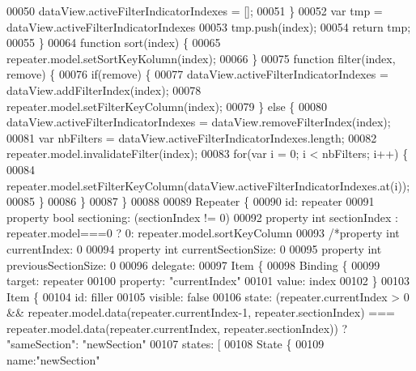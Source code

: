 \begin{DoxyCode}
00050             dataView.activeFilterIndicatorIndexes = [];
00051         \}
00052         var tmp = dataView.activeFilterIndicatorIndexes
00053         tmp.push(index);
00054         \textcolor{keywordflow}{return} tmp;
00055     \}
00064     \textcolor{keyword}{function} sort(index) \{
00065         repeater.model.setSortKeyKolumn(index);
00066     \}
00075     \textcolor{keyword}{function} filter(index, \textcolor{keyword}{remove}) \{
00076         \textcolor{keywordflow}{if}(\textcolor{keyword}{remove}) \{
00077             dataView.activeFilterIndicatorIndexes = dataView.addFilterIndex(index);
00078             repeater.model.setFilterKeyColumn(index);
00079         \} \textcolor{keywordflow}{else} \{
00080             dataView.activeFilterIndicatorIndexes = dataView.removeFilterIndex(index);
00081             var nbFilters = dataView.activeFilterIndicatorIndexes.length;
00082             repeater.model.invalidateFilter(index);
00083             \textcolor{keywordflow}{for}(var i = 0; i < nbFilters; i++) \{
00084                 repeater.model.setFilterKeyColumn(dataView.activeFilterIndicatorIndexes.at(i));
00085             \}
00086         \}
00087     \}
00088 
00089     Repeater \{
00090         \textcolor{keywordtype}{id}: repeater
00091         \textcolor{keyword}{property} \textcolor{keywordtype}{bool} sectioning: (sectionIndex != 0)
00092         property \textcolor{keywordtype}{int} sectionIndex : repeater.model===0 ? 0: repeater.model.sortKeyColumn
00093         \textcolor{comment}{/*property int currentIndex: 0}
00094 \textcolor{comment}{        property int currentSectionSize: 0}
00095 \textcolor{comment}{        property int previousSectionSize: 0}
00096 \textcolor{comment}{        delegate:}
00097 \textcolor{comment}{            Item \{}
00098 \textcolor{comment}{            Binding \{}
00099 \textcolor{comment}{                target: repeater}
00100 \textcolor{comment}{                property: "currentIndex"}
00101 \textcolor{comment}{                value: index}
00102 \textcolor{comment}{            \}}
00103 \textcolor{comment}{            Item \{}
00104 \textcolor{comment}{                id: filler}
00105 \textcolor{comment}{                visible: false}
00106 \textcolor{comment}{                state: (repeater.currentIndex > 0 && repeater.model.data(repeater.currentIndex-1,
       repeater.sectionIndex) === repeater.model.data(repeater.currentIndex, repeater.sectionIndex)) ? "sameSection":
       "newSection"}
00107 \textcolor{comment}{                states: [}
00108 \textcolor{comment}{                    State \{}
00109 \textcolor{comment}{                        name:"newSection"}

\end{DoxyCode}
